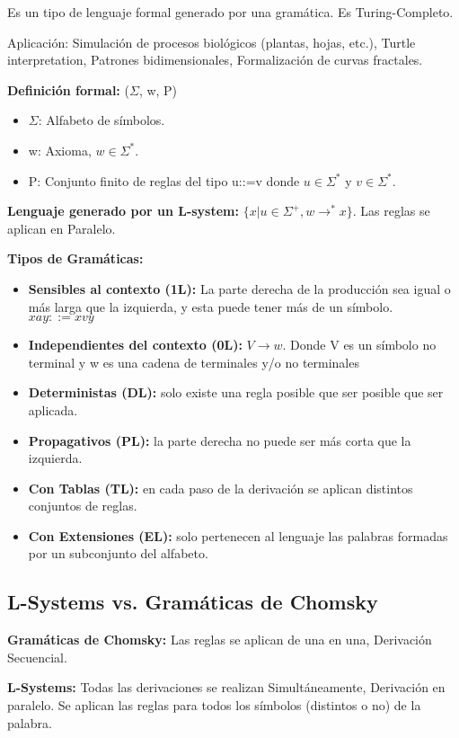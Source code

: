 Es un tipo de lenguaje formal generado por una gramática. Es Turing-Completo.

Aplicación: Simulación de procesos biológicos (plantas, hojas, etc.), Turtle interpretation, Patrones bidimensionales, Formalización de curvas fractales.

\textbf{Definición formal:} ($\Sigma$, w, P)
\begin{itemize}
    \item $\Sigma$: Alfabeto de símbolos.
    \item w: Axioma, $w \in \Sigma^*$.
    \item P: Conjunto finito de reglas del tipo u::=v donde $u \in \Sigma^*$ y $v \in \Sigma^*$.
\end{itemize}

\textbf{Lenguaje generado por un L-system:} $\{x | u \in \Sigma^+, w \rightarrow^* x\}$. Las reglas se aplican en Paralelo.

\textbf{Tipos de Gramáticas:}
\begin{itemize}
    \item \textbf{Sensibles al contexto (1L):} La parte derecha de la producción sea igual o más larga que la izquierda, y esta puede tener más de un símbolo. $xay::=xvy$
    \item \textbf{Independientes del contexto (0L):} $V \rightarrow w$. Donde V es un símbolo no terminal y w es una cadena de terminales y/o no terminales
    \item \textbf{Deterministas (DL):} solo existe una regla posible que ser posible que ser aplicada.
    \item \textbf{Propagativos (PL):} la parte derecha no puede ser más corta que la izquierda.
    \item \textbf{Con Tablas (TL):} en cada paso de la derivación se aplican distintos conjuntos de reglas.
    \item \textbf{Con Extensiones (EL):} solo pertenecen al lenguaje las palabras formadas por un subconjunto del alfabeto.
\end{itemize}

\subsection{L-Systems vs. Gramáticas de Chomsky}
\textbf{Gramáticas de Chomsky:} Las reglas se aplican de una en una, Derivación Secuencial.

\textbf{L-Systems:} Todas las derivaciones se realizan Simultáneamente, Derivación en paralelo. Se aplican las reglas para todos los símbolos (distintos o no) de la palabra.


